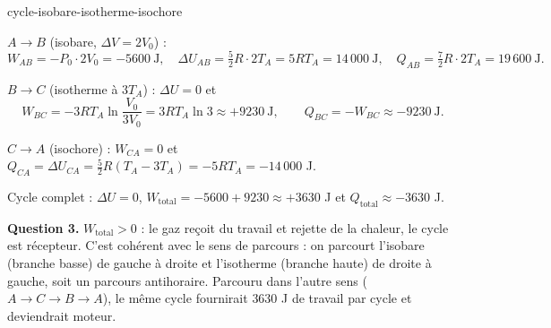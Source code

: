 \begin{exo}{cycle-isobare-isotherme-isochore}
\begin{solution}
$A\to B$ (isobare, $\Delta V = 2V_0$) :
\[
W_{AB} = -P_0\cdot 2V_0 = -5600\ \text{J},\quad \Delta U_{AB} = \tfrac{5}{2}R\cdot 2T_A = 5RT_A = 14\,000\ \text{J},\quad Q_{AB} = \tfrac{7}{2}R\cdot2T_A = 19\,600\ \text{J}.
\]

$B\to C$ (isotherme à $3T_A$) : $\Delta U = 0$ et
\[
W_{BC} = -3RT_A\ln\frac{V_0}{3V_0} = 3RT_A\ln 3 \approx +9230\ \text{J}, \qquad Q_{BC} = -W_{BC} \approx -9230\ \text{J}.
\]

$C\to A$ (isochore) : $W_{CA} = 0$ et $Q_{CA} = \Delta U_{CA} = \tfrac{5}{2}R(T_A - 3T_A) = -5RT_A = -14\,000$ J.

Cycle complet : $\Delta U = 0$, $W_{\text{total}} = -5600 + 9230 \approx +3630$ J et $Q_{\text{total}} \approx -3630$ J.

\textbf{Question 3.} $W_{\text{total}} > 0$ : le gaz reçoit du travail et rejette de la chaleur, le cycle est récepteur. C'est cohérent avec le sens de parcours : on parcourt l'isobare (branche basse) de gauche à droite et l'isotherme (branche haute) de droite à gauche, soit un parcours antihoraire. Parcouru dans l'autre sens ($A\to C\to B\to A$), le même cycle fournirait $3630$ J de travail par cycle et deviendrait moteur.
\end{solution}
\end{exo}

